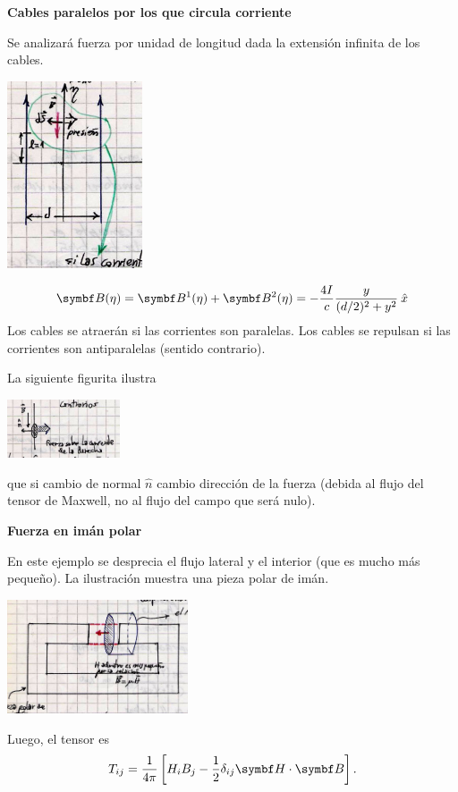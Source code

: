 \documentclass[10pt,oneside]{CBFT_book}
\begin{document}
\begin{ejemplo}{\bf Cables paralelos por los que circula corriente}

Se analizará fuerza por unidad de longitud dada la extensión infinita de los cables.

\includegraphics[width=0.3\textwidth]{images/fig_ft1_cablesParalelosCorriente.jpg}

\[
	\vb{B}(\eta) = \vb{B}^1(\eta) + \vb{B}^2(\eta) = - \frac{4I}{c} \frac{y}{(d/2)^2 + y^2} \xver
\]
Los cables se atraerán si las corrientes son paralelas. Los cables se repulsan si las
corrientes son antiparalelas (sentido contrario).

La siguiente figurita  ilustra

\includegraphics[width=0.25\textwidth]{images/fig_ft1_cablesParalelosCorrienteB.jpg}

que si cambio de normal $\hat{n}$ cambio dirección de la fuerza (debida al flujo del tensor
de Maxwell, no al flujo del campo que será nulo).
 
\end{ejemplo}

\begin{ejemplo}{\bf Fuerza en imán polar}

En este ejemplo se desprecia el flujo lateral y el interior (que es mucho más pequeño).
La ilustración muestra una pieza polar de imán.

\includegraphics[width=0.4\textwidth]{images/fig_ft1_imanPolar.jpg}
 
Luego, el tensor es
\[
	T_{ij} = \frac{1}{4\pi} \left[ H_i B_j - \frac{1}{2} \delta_{ij} \vb{H}\cdot\vb{B} \right].
\]
 
\end{ejemplo}
\end{document}
